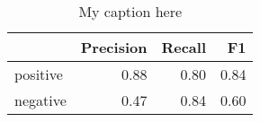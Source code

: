 \begin{table}[!ht]
\centering
\begin{tabular}{lrrr}
\toprule
{} &  Precision &  Recall &   F1 \\
\midrule
positive &       0.88 &    0.80 & 0.84 \\
negative &       0.47 &    0.84 & 0.60 \\
\bottomrule
\end{tabular}
\caption{My caption here}
\label{tab:POLARITY-ocd-combined-F1}
\end{table}